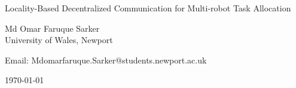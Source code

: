 %
%
%
%

\begin{titlepage}

\begin{center}
\noindent
\huge
Locality-Based Decentralized Communication for Multi-robot Task Allocation
\end{center}

\begin{center}
\noindent
\huge
Md Omar Faruque Sarker\\[10pt]
\large
University of Wales, Newport\\[16pt]
\end{center}

%

\begin{center}
\noindent
Email: Mdomarfaruque.Sarker@students.newport.ac.uk \\
\end{center}

\begin{center}
\noindent
\today
\end{center}

\end{titlepage}

	
